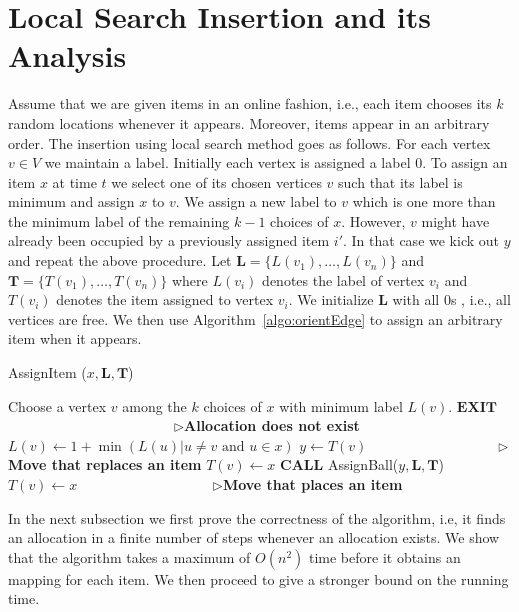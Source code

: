 \section{Local Search Insertion and its Analysis}
Assume that we are given items in an online fashion, i.e., each item chooses its $k$ random locations whenever it appears. Moreover, items appear in an arbitrary order.  The insertion using local search method goes as follows. For each vertex $v\in V$ we maintain a label. Initially each vertex is assigned a label $0$. To assign an item $x$ at time $t$ we select one of its chosen vertices $v$ such that its label is minimum and assign $x$ to $v$. We assign a new label to $v$ which is one more than the minimum label of the remaining $k-1$ choices of $x$. However,  $v$ might have already been occupied by a previously assigned item $i'$. In that case we kick out $y$ and repeat the above procedure. Let $\mathbf{L}= \{ L(v_1), \ldots, L(v_n)\}$  and $\mathbf{T}= \{ T(v_1), \ldots, T(v_n)\}$ where $L(v_i)$ denotes the label of vertex $v_i$ and $T(v_i)$ denotes the item assigned to vertex $v_i$.  We initialize $\mathbf{L}$ with all $0$s , i.e., all vertices are free. We then use Algorithm~\ref{algo:orientEdge} to assign an arbitrary item when it appears. 
\begin{algorithm}[h!]
\caption{AssignItem ($x, \mathbf{L},\mathbf{T}$)}
\label{algo:orientEdge}
\begin{algorithmic}[1]
\STATE Choose a vertex $v$ among the $k$ choices of $x$ with minimum label $L(v)$.
\STATE $\mathbf{EXIT}$  ~~~~~~~~~~~~~~~~~~~~~~~ $\rhd${\textbf{Allocation does not exist}}
\ELSE
\STATE $L(v) \leftarrow 1+ \min{(L(u)| u \neq v \text{~and $u \in x$})}$
\STATE $y\leftarrow T(v)$~~~~~~~~~~~~~~~~~~ $\rhd${\textbf{Move that replaces an item}}
\STATE $T(v) \leftarrow x$
\STATE $\mathbf{CALL}$ {AssignBall($y, \mathbf{L},\mathbf{T}$)}
\ELSE  
\STATE $T(v) \leftarrow x$ ~~~~~~~~~~~~~~~~~~ $\rhd${\textbf{Move that places an item}}
\ENDIF
\ENDIF
\end{algorithmic}
\end{algorithm}
In the next subsection we first prove the correctness of the algorithm, i.e, it finds an allocation in a finite number of steps whenever an allocation exists. We show that the algorithm takes a maximum of $O(n^2)$ time before it obtains an mapping for each item. We then proceed to give a stronger bound on the running time.



